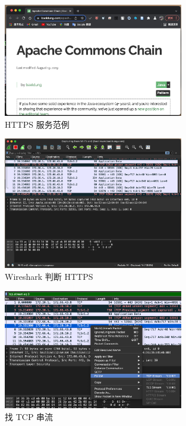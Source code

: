 \begin{figure}[htb]
\centering 
\includegraphics[width=0.70\textwidth]{img/ch1s4m2.png} 
\caption{HTTPS 服务范例}
\label{Test}
\end{figure}

\begin{figure}[htb]
\centering 
\includegraphics[width=0.70\textwidth]{img/ch1s4m3.png} 
\caption{Wireshark 判断 HTTPS}
\label{Test}
\end{figure}

\begin{figure}[htb]
\centering 
\includegraphics[width=0.70\textwidth]{img/ch1s4m4.png} 
\caption{找 TCP 串流}
\label{Test}
\end{figure}

